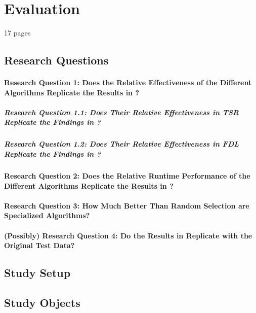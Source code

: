 \documentclass[a4paper,10pt]{article}
\begin{document}
\section{Evaluation}

17 pages

\subsection{Research Questions}

\paragraph{Research Question 1: Does the Relative Effectiveness of the Different Algorithms Replicate the Results in \citealt{cruciani2019scalable}?}

\subparagraph{Research Question 1.1: Does Their Relative Effectiveness in TSR Replicate the Findings in \citealt{cruciani2019scalable}?}

\subparagraph{Research Question 1.2: Does Their Relative Effectiveness in FDL Replicate the Findings in \citealt{cruciani2019scalable}?}

\paragraph{Research Question 2: Does the Relative Runtime Performance of the Different Algorithms Replicate the Results in \citealt{cruciani2019scalable}?}

\paragraph{Research Question 3: How Much Better Than Random Selection are Specialized Algorithms?}

\paragraph{(Possibly) Research Question 4: Do the Results in \citealt{cruciani2019scalable} Replicate with the Original Test Data?}

\subsection{Study Setup}

\subsection{Study Objects}
\end{document}
